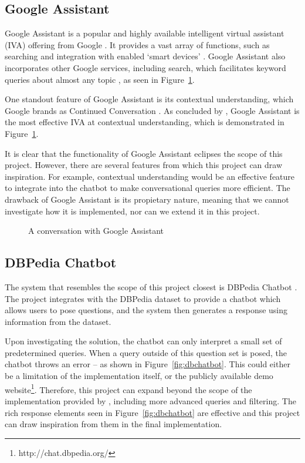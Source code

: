 \subsection{Google Assistant}
Google Assistant is a popular and highly available intelligent virtual assistant (IVA) offering from Google \cite{lopez2017alexa}. It provides a vast array of functions, such as searching and integration with enabled `smart devices' \cite{googleassistant}. Google Assistant also incorporates other Google services, including search, which facilitates keyword queries about almost any topic \cite{michaely2017keyword}, as seen in Figure~\ref{fig:assistant}.

One standout feature of Google Assistant is its contextual understanding, which Google brands as Continued Conversation \cite{paplauskaite2016}. As concluded by \citet{tulshan2019survey}, Google Assistant is the most effective IVA at contextual understanding, which is demonstrated in Figure~\ref{fig:assistant}.

It is clear that the functionality of Google Assistant eclipses the scope of this project. However, there are several features from which this project can draw inspiration. For example, contextual understanding would be an effective feature to integrate into the chatbot to make conversational queries more efficient. The drawback of Google Assistant is its propietary nature, meaning that we cannot investigate how it is implemented, nor can we extend it in this project.

\begin{figure}[h]
	\centering
    \qquad
	\caption{A conversation with Google Assistant}
	\label{fig:assistant}
\end{figure}

\newpage
\subsection{DBPedia Chatbot}
\label{sec:dbchatbot}
The system that resembles the scope of this project closest is DBPedia Chatbot \cite{ramngongausbeck2018}. The project integrates with the DBPedia dataset to provide a chatbot which allows users to pose questions, and the system then generates a response using information from the dataset.

Upon investigating the solution, the chatbot can only interpret a small set of predetermined queries. When a query outside of this question set is posed, the chatbot throws an error -- as shown in Figure~\ref{fig:dbchatbot}. This could either be a limitation of the implementation itself, or the publicly available demo website\footnote{http://chat.dbpedia.org/}. Therefore, this project can expand beyond the scope of the implementation provided by \citet{ramngongausbeck2018}, including more advanced queries and filtering. The rich response elements seen in Figure~\ref{fig:dbchatbot} are effective and this project can draw inspiration from them in the final implementation.

